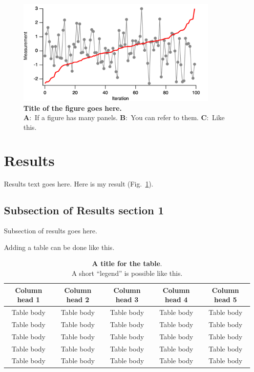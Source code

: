 \documentclass[11pt,a4paper]{article}
\begin{document}
\begin{figure}
     \centering
     \includegraphics[width=10cm]{Fig_1}
        \caption{\textbf{Title of the figure goes here.}\\
                \textbf{A}:~If a figure has many panels.
                \textbf{B}:~You can refer to them.
                \textbf{C}:~Like this.
        }
        \label{fig:1}
\end{figure}

\section*{Results}

Results text goes here. 
Here is my result (Fig.~\ref{fig:1}).
\lipsum[19]

\subsection*{Subsection of Results section 1}
Subsection of results goes here.
\lipsum[20]

Adding a table can be done like this.

\begin{table}[!htp]
    \centering
    \begin{tabular}{c | c c c c}
    Column head 1 & Column head 2 & Column head 3 & Column head 4 & Column head 5\\
    \hline
    Table body & Table body & Table body  & Table body  & Table body  \\
    Table body & Table body & Table body  & Table body  & Table body  \\
    Table body & Table body & Table body  & Table body  & Table body  \\
    Table body & Table body & Table body  & Table body  & Table body  \\
    Table body & Table body & Table body  & Table body  & Table body  \\
    \end{tabular}
    \caption{
        \textbf{A title for the table}.\\
        A short ``legend'' is possible like this.}
    \label{table:example}
\end{table}
\end{document}

